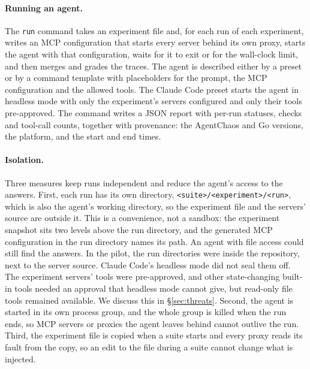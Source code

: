 \paragraph{Running an agent.} The \texttt{run} command takes an experiment file and, for each run of each experiment, writes an MCP configuration that starts every server behind its own proxy, starts the agent with that configuration, waits for it to exit or for the wall-clock limit, and then merges and grades the traces. The agent is described either by a preset or by a command template with placeholders for the prompt, the MCP configuration and the allowed tools. The Claude Code preset starts the agent in headless mode with only the experiment's servers configured and only their tools pre-approved. The command writes a JSON report with per-run statuses, checks and tool-call counts, together with provenance: the AgentChaos and Go versions, the platform, and the start and end times.

\paragraph{Isolation.} Three measures keep runs independent and reduce the agent's access to the answers. First, each run has its own directory, \texttt{<suite>/<experiment>/<run>}, which is also the agent's working directory, so the experiment file and the servers' source are outside it. This is a convenience, not a sandbox: the experiment snapshot sits two levels above the run directory, and the generated MCP configuration in the run directory names its path. An agent with file access could still find the answers. In the pilot, the run directories were inside the repository, next to the server source. Claude Code's headless mode did not seal them off. The experiment servers' tools were pre-approved, and other state-changing built-in tools needed an approval that headless mode cannot give, but read-only file tools remained available. We discuss this in \S\ref{sec:threats}. Second, the agent is started in its own process group, and the whole group is killed when the run ends, so MCP servers or proxies the agent leaves behind cannot outlive the run. Third, the experiment file is copied when a suite starts and every proxy reads its fault from the copy, so an edit to the file during a suite cannot change what is injected.

